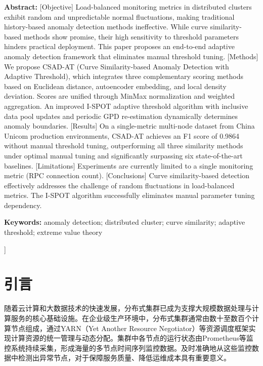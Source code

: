 \documentclass[10.5pt,a4paper,twocolumn]{ctexart}
\begin{document}
\begin{@twocolumnfalse}
\begin{center}
\parbox{0.92\textwidth}{
\textbf{Abstract:} [Objective] Load-balanced monitoring metrics in distributed clusters exhibit random and unpredictable normal fluctuations, making traditional history-based anomaly detection methods ineffective. While curve similarity-based methods show promise, their high sensitivity to threshold parameters hinders practical deployment. This paper proposes an end-to-end adaptive anomaly detection framework that eliminates manual threshold tuning. [Methods] We propose CSAD-AT (Curve Similarity-based Anomaly Detection with Adaptive Threshold), which integrates three complementary scoring methods based on Euclidean distance, autoencoder embedding, and local density deviation. Scores are unified through MinMax normalization and weighted aggregation. An improved I-SPOT adaptive threshold algorithm with inclusive data pool updates and periodic GPD re-estimation dynamically determines anomaly boundaries. [Results] On a single-metric multi-node dataset from China Unicom production environments, CSAD-AT achieves an F1 score of 0.9864 without manual threshold tuning, outperforming all three similarity methods under optimal manual tuning and significantly surpassing six state-of-the-art baselines. [Limitations] Experiments are currently limited to a single monitoring metric (RPC connection count). [Conclusions] Curve similarity-based detection effectively addresses the challenge of random fluctuations in load-balanced metrics. The I-SPOT algorithm successfully eliminates manual parameter tuning dependency.
}
\vspace{0.4em}

\parbox{0.92\textwidth}{
\textbf{Keywords:} anomaly detection; distributed cluster; curve similarity; adaptive threshold; extreme value theory
}
\vspace{1.5em}
\end{center}
\end{@twocolumnfalse}
]


\section{引言}

随着云计算和大数据技术的快速发展，分布式集群已成为支撑大规模数据处理与计算服务的核心基础设施。在企业级生产环境中，分布式集群通常由数十至数百个计算节点组成，通过YARN（Yet Another Resource Negotiator）等资源调度框架实现计算资源的统一管理与动态分配。集群中各节点的运行状态由Prometheus等监控系统持续采集，形成海量的多节点时间序列监控数据。及时准确地从这些监控数据中检测出异常节点，对于保障服务质量、降低运维成本具有重要意义。
\end{document}
